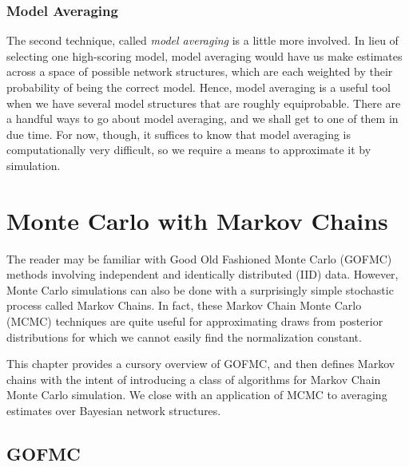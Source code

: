 \documentclass[12pt,twoside]{reedthesis}
\begin{document}
	\subsection*{Model Averaging}
	The second technique, called {\em model averaging} is a little more involved. In lieu of selecting one high-scoring model, model averaging would have us make estimates across a space of possible network structures, which are each weighted by their probability of being the correct model. Hence, model averaging is a useful tool when we have several model structures that are roughly equiprobable. There are a handful ways to go about model averaging, and we shall get to one of them in due time. For now, though, it suffices to know that model averaging is computationally very difficult, so we require a means to approximate it by simulation.
	
\chapter{Monte Carlo with Markov Chains}
	The reader may be familiar with Good Old Fashioned Monte Carlo (GOFMC) methods involving independent and identically distributed (IID) data. However, Monte Carlo simulations can also be done with a surprisingly simple stochastic process called Markov Chains. In fact, these Markov Chain Monte Carlo (MCMC) techniques are quite useful for approximating draws from posterior distributions for which we cannot easily find the normalization constant. 
	
	This chapter provides a cursory overview of GOFMC, and then defines Markov chains with the intent of introducing a class of algorithms for Markov Chain Monte Carlo simulation. 
	We close with an application of MCMC to averaging estimates over Bayesian network structures.
	
	\section{GOFMC}
\end{document}
